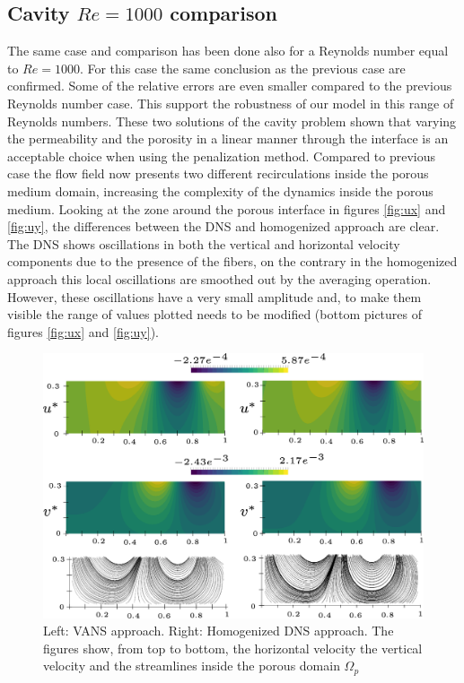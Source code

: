 \subsection{Cavity $Re=1000$ comparison}

The same case and comparison has been done also for a Reynolds number equal to $Re=1000$.
For this case the same conclusion as the previous case are confirmed. Some of the relative errors are even smaller compared to the previous Reynolds number case. This support the robustness of our model in this range of Reynolds numbers.
These two solutions of the cavity problem shown that varying the permeability and the porosity in a linear manner through the interface is an acceptable choice when using the penalization method.
Compared to previous case the flow field now presents two different recirculations inside the porous medium domain, increasing the complexity of the dynamics inside the porous medium. Looking at the zone around the porous interface in figures \ref{fig:ux} and \ref{fig:uy}, the differences between the DNS and homogenized approach are clear. The DNS shows oscillations in both the vertical and horizontal velocity components due to the presence of the fibers, on the contrary in the homogenized approach this local oscillations are smoothed out by the averaging operation. However, these oscillations have a very small amplitude and, to make them visible the range of values plotted needs to be modified (bottom pictures of figures \ref{fig:ux} and \ref{fig:uy}).

\begin{figure}[H]
	\centering
	\includegraphics[width=1\linewidth]{chapter_5/figure/re1000/vans_u}
	\caption{Left: VANS approach. Right: Homogenized DNS approach. The figures show, from top to bottom, the horizontal velocity the vertical velocity and the streamlines inside the porous domain $\Omega_p$}
	\label{fig:1000_u}
\end{figure}

